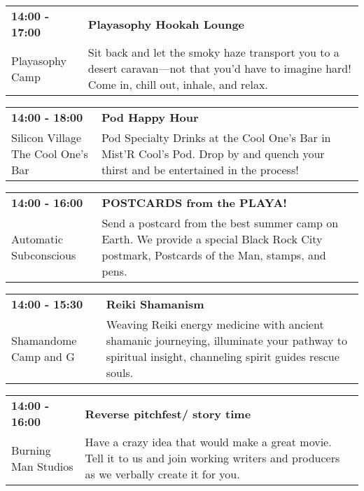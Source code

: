 \begin{tabular}{ p{1in} p{2.2in} }
    \textbf{14:00 - 17:00} & \textbf{Playasophy Hookah Lounge} \\
    Playasophy Camp \newline  & Sit back and let the smoky haze transport you to a desert caravan---not that you'd have to imagine hard! Come in, chill out, inhale, and relax. \\
    \hline 
\end{tabular}
    
\begin{tabular}{ p{1in} p{2.2in} }
    \textbf{14:00 - 18:00} & \textbf{Pod Happy Hour} \\
    Silicon Village \newline The Cool One's Bar & Pod Specialty Drinks at the Cool One's Bar in Mist'R Cool's Pod.
Drop by and quench your thirst and be entertained in the process! \\
    \hline 
\end{tabular}
    
\begin{tabular}{ p{1in} p{2.2in} }
    \textbf{14:00 - 16:00} & \textbf{POSTCARDS from the PLAYA!} \\
    Automatic Subconscious \newline  & Send a postcard from the best summer camp on Earth. We provide a special Black Rock City postmark, Postcards of the Man, stamps, and pens. \\
    \hline 
\end{tabular}
    
\begin{tabular}{ p{1in} p{2.2in} }
    \textbf{14:00 - 15:30} & \textbf{Reiki Shamanism } \\
    Shamandome Camp \newline 615 and G & Weaving Reiki energy medicine with ancient shamanic journeying, illuminate your pathway to spiritual insight, channeling spirit guides rescue souls. \\
    \hline 
\end{tabular}
    
\begin{tabular}{ p{1in} p{2.2in} }
    \textbf{14:00 - 16:00} & \textbf{Reverse pitchfest/ story time} \\
    Burning Man Studios \newline  & Have a crazy idea that would make a great movie.  Tell it to us and join working writers and producers as we verbally create it for you. \\
    \hline 
\end{tabular}
    
